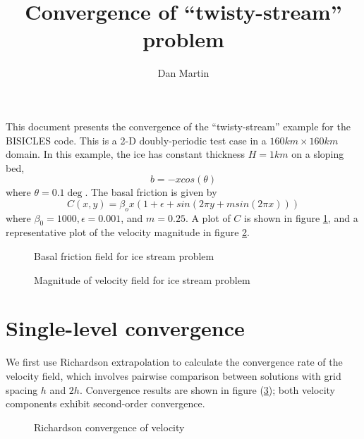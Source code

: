 \documentclass[12pt]{article}
\title{Convergence of ``twisty-stream'' problem}
\author{Dan Martin}
\newcommand{\topg}{b} %
\begin{document}
\maketitle

This document presents the convergence of the ``twisty-stream'' example for
the BISICLES code. This is a 2-D doubly-periodic test case in a $160km \times
160 km$ domain. In this
example, the ice has constant thickness $H = 1 km$ on a sloping bed, 
\begin{equation}
\topg = -x cos( \theta )
\end{equation}
where $\theta= 0.1 \deg$. The basal friction is given by 
\begin{equation}
C(x,y) = \beta_o x( 1 + \epsilon + sin(2 \pi  y + m sin(2 \pi x) ) )
\end{equation}
where $\beta_0 = 1000, \epsilon = 0.001$, and $m = 0.25$. A plot of
$C$ is shown in figure \ref{fig:streamFriction}, and a representative plot 
of the velocity magnitude in figure \ref{fig:streamMagVel}.

\begin{figure}
\centering
{}
\caption{Basal friction field for ice stream problem}
\label{fig:streamFriction}
\end{figure}


\begin{figure}
\centering
{}
\caption{Magnitude of velocity field for ice stream problem}
\label{fig:streamMagVel}
\end{figure}




\section{Single-level convergence}
We first use Richardson extrapolation to calculate the convergence rate of the
velocity field, which involves pairwise comparison between solutions with grid
spacing $h$ and $2h$. Convergence results are shown in figure
(\ref{fig:RichardsonConverge}); both velocity components exhibit second-order
convergence. 

\begin{figure}
\centering
{}
\caption{Richardson convergence of velocity}
\label{fig:RichardsonConverge}
\end{figure}
\end{document}
